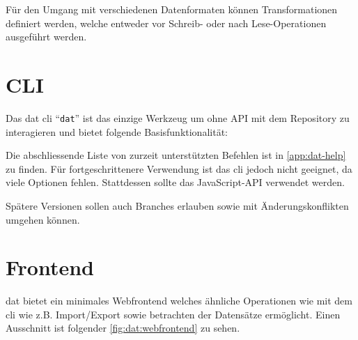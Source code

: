 Für den Umgang mit verschiedenen Datenformaten können Transformationen\cite[transformations]{dat-js-api} definiert werden, welche entweder vor Schreib- oder nach Lese-Operationen ausgeführt werden.


\section{CLI}


Das \gls{dat} \gls{cli} ``\texttt{dat}'' ist das einzige Werkzeug um ohne API mit dem Repository zu interagieren und bietet folgende Basisfunktionalität:


Die abschliessende Liste von zurzeit unterstützten Befehlen ist in 
\vref{app:dat-help} zu finden. Für fortgeschrittenere Verwendung ist das \gls{cli} jedoch nicht geeignet, da viele Optionen fehlen. Stattdessen sollte das JavaScript-API verwendet werden.

Spätere Versionen sollen auch Branches erlauben sowie mit Änderungskonflikten umgehen können.

\section{Frontend}

\Gls{dat} bietet ein minimales Webfrontend welches ähnliche Operationen wie mit dem \gls{cli} wie z.B. Import/Export sowie betrachten der Datensätze ermöglicht. Einen Ausschnitt ist folgender \cref{fig:dat:webfrontend} zu sehen.

